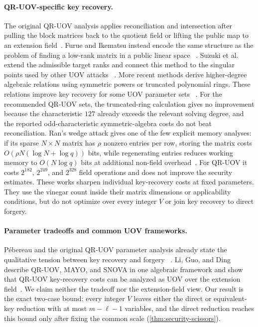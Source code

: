 \documentclass[11pt,a4paper]{article}
\theoremstyle{definition}
\theoremstyle{remark}
\begin{document}
\paragraph{QR-UOV-specific key recovery.}
The original QR-UOV analysis applies reconciliation and intersection after
pulling the block matrices back to the quotient field or lifting the public
map to an extension field~\cite{QRUOVOriginal}.  Furue and Ikematsu instead
encode the same structure as the problem of finding a low-rank matrix in a
public linear space
~\cite{FurueIkematsu}.  Suzuki et al. extend the admissible target ranks and
connect this method to the singular points used by other UOV attacks
~\cite{Suzuki}.  More recent methods derive higher-degree algebraic relations
using symmetric powers or truncated polynomial rings.  These relations
improve key recovery for some UOV parameter sets
~\cite{FurueIkematsu2026,JinEtAl2026}.  For the recommended QR-UOV sets, the
truncated-ring calculation gives no improvement because the characteristic
$127$ already exceeds the relevant solving degree, and the reported
odd-characteristic symmetric-algebra costs do not beat reconciliation.  Ran's
wedge attack gives one of the few explicit memory analyses: if its sparse
$N\times N$ matrix has $\rho$ nonzero entries per row, storing the matrix costs
$O(\rho N(\log N+\log q))$ bits, while regenerating entries reduces working
memory to $O(N\log q)$ bits at additional non-field overhead~\cite{RanWedges}.
For QR-UOV it costs $2^{182}$, $2^{249}$, and $2^{328}$ field operations and
does not improve the security estimates.  These works sharpen individual
key-recovery costs at fixed parameters.  They use the vinegar count inside
their matrix dimensions or applicability conditions, but do not optimize over
every integer $V$ or join key recovery to direct forgery.

\paragraph{Parameter tradeoffs and common UOV frameworks.}
P\'ebereau and the original QR-UOV parameter analysis already state the
qualitative tension between key recovery and forgery
~\cite{QRUOVOriginal,Pebereau}.  Li, Guo, and Ding describe QR-UOV, MAYO, and
SNOVA in one algebraic framework and show that QR-UOV key-recovery costs can
be analyzed as UOV over the extension field~\cite{LiGuoDing2025}.  We claim neither the
tradeoff nor the extension-field view.  Our result is the exact two-case bound:
every integer $V$ leaves either the direct or equivalent-key reduction with at
most $m-\ell-1$ variables, and the direct reduction reaches this bound only
after fixing the common scale (\cref{thm:security-scissors}).
\end{document}
